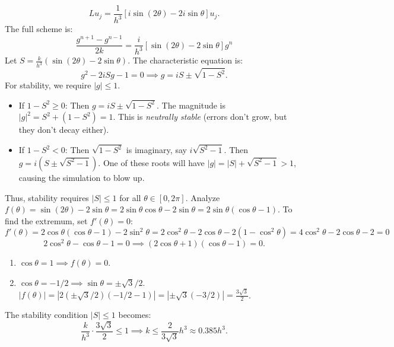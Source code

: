 \begin{solution}
\[ L u_j = \frac{1}{h^3} [ i \sin(2\theta) - 2 i \sin\theta ] u_j. \]
The full scheme is:
\[ \frac{g^{n+1} - g^{n-1}}{2k} = \frac{i}{h^3} [ \sin(2\theta) - 2 \sin\theta ] g^n \]
Let $S = \frac{k}{h^3} (\sin(2\theta) - 2 \sin\theta)$. The characteristic equation is:
\[ g^2 - 2 i S g - 1 = 0 \implies g = i S \pm \sqrt{1 - S^2}. \]
For stability, we require $|g| \leq 1$.
\begin{itemize}
    \item If $1 - S^2 \geq 0$: Then $g = iS \pm \sqrt{1-S^2}$. The magnitude is $|g|^2 = S^2 + (1 - S^2) = 1$. This is \textit{neutrally stable} (errors don't grow, but they don't decay either).
    \item If $1 - S^2 < 0$: Then $\sqrt{1-S^2}$ is imaginary, say $i\sqrt{S^2-1}$. Then $g = i(S \pm \sqrt{S^2-1})$. One of these roots will have $|g| = |S| + \sqrt{S^2 - 1} > 1$, causing the simulation to blow up.
\end{itemize}
Thus, stability requires $|S| \leq 1$ for all $\theta \in [0, 2\pi]$.
Analyze $f(\theta) = \sin(2\theta) - 2 \sin\theta = 2 \sin\theta \cos\theta - 2 \sin\theta = 2 \sin\theta (\cos\theta - 1)$.
To find the extremum, set $f'(\theta) = 0$:
\[ f'(\theta) = 2 \cos\theta (\cos\theta - 1) - 2 \sin^2\theta = 2 \cos^2\theta - 2 \cos\theta - 2(1 - \cos^2\theta) = 4 \cos^2\theta - 2 \cos\theta - 2 = 0 \]
\[ 2 \cos^2\theta - \cos\theta - 1 = 0 \implies (2 \cos\theta + 1)(\cos\theta - 1) = 0. \]
\begin{enumerate}
    \item $\cos\theta = 1 \implies f(\theta) = 0$.
    \item $\cos\theta = -1/2 \implies \sin\theta = \pm \sqrt{3}/2$.
    $|f(\theta)| = |2 (\pm \sqrt{3}/2) (-1/2 - 1)| = | \pm \sqrt{3} (-3/2) | = \frac{3\sqrt{3}}{2}$.
\end{enumerate}
The stability condition $|S| \leq 1$ becomes:
\[ \frac{k}{h^3} \cdot \frac{3\sqrt{3}}{2} \leq 1 \implies \boxed{k \leq \frac{2}{3\sqrt{3}} h^3 \approx 0.385 h^3}. \]
\end{solution}


